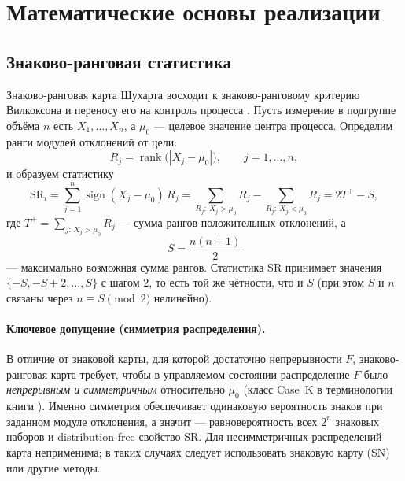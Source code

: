 \documentclass[11pt,a4paper]{article}
\newcommand{\SR}{\mathrm{SR}}
\begin{document}
\section{Математические основы реализации}
\label{sec:math}

\subsection{Знаково-ранговая статистика}
\label{sec:sr-stat}

Знаково-ранговая карта Шухарта восходит к знаково-ранговому критерию
Вилкоксона \cite{Wilcoxon1945,Bakir2004} и переносу его на контроль
процесса \cite{Gibbons2010,Chakraborti2019}. Пусть измерение в подгруппе
объёма $n$ есть $X_1,\dots,X_n$, а $\mu_0$ --- целевое значение центра
процесса. Определим ранги модулей отклонений от цели:
\begin{equation}
R_j=\operatorname{rank}\bigl(|X_j-\mu_0|\bigr),\qquad j=1,\dots,n,
\label{eq:rank}
\end{equation}
и образуем статистику
\begin{equation}
\SR_i=\sum_{j=1}^{n}\operatorname{sign}(X_j-\mu_0)\,R_j
      =\sum_{R_j:\ X_j>\mu_0} R_j-\sum_{R_j:\ X_j<\mu_0} R_j
      =2T^+-S,
\label{eq:sr}
\end{equation}
где $T^+=\sum_{j:\,X_j>\mu_0} R_j$ --- сумма рангов положительных
отклонений, а
\begin{equation}
S=\frac{n(n+1)}{2}
\label{eq:S}
\end{equation}
--- максимально возможная сумма рангов. Статистика $\SR$ принимает
значения $\{-S,-S+2,\dots,S\}$ с шагом $2$, то есть той же чётности, что и
$S$ (при этом $S$ и $n$ связаны через $n\equiv S\!\pmod 2$ нелинейно).

\paragraph{Ключевое допущение (симметрия распределения).} В отличие от
знаковой карты, для которой достаточно непрерывности $F$, знаково-ранговая
карта требует, чтобы в управляемом состоянии распределение $F$ было
\emph{непрерывным и симметричным} относительно $\mu_0$ (класс Case~K в
терминологии книги \cite[гл.~4]{Chakraborti2019}). Именно симметрия
обеспечивает одинаковую вероятность знаков при заданном модуле отклонения,
а значит --- равновероятность всех $2^n$ знаковых наборов и
distribution-free свойство $\SR$. Для несимметричных распределений карта
неприменима; в таких случаях следует использовать знаковую карту (SN) или
другие методы.
\end{document}
